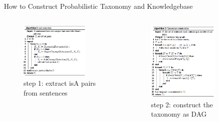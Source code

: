 \documentclass[11pt, a4paper]{beamer}
\begin{document}
\begin{frame}{How to Construct Probabilistic Taxonomy and Knowledgebase}
\begin{columns}[T]
    \begin{column}{0.5\textwidth}
        \begin{center}
            \begin{figure}
                \includegraphics[width=0.8\textwidth]{./figure/is_a_extraction.png}
                \caption{\small{step 1: extract isA pairs from sentences}}
            \end{figure}
        \end{center}
    \end{column}
    \begin{column}{0.5\textwidth}
        \begin{center}
            \begin{figure}
                \includegraphics[width=0.8\textwidth]{./figure/taxonomy_construction.png}
                \caption{\small{step 2: construct the taxonomy as DAG}}
            \end{figure}
        \end{center}
    \end{column}
\end{columns}
\end{frame}
\end{document}
